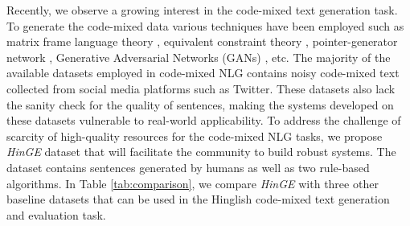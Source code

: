 \documentclass[11pt]{article}
\begin{document}
Recently, we observe a growing interest in the code-mixed text generation task. To generate the code-mixed data various techniques have been employed such as matrix frame language theory \cite{Lee2019, gupta-etal-2020-semi, dhruval_GCM_dependency_2021}, equivalent constraint theory \cite{pratapa-etal-2018-language}, pointer-generator network \cite{2018arXiv181010254I, winata-etal-2019-code, gupta-etal-2020-semi}, Generative Adversarial Networks (GANs) \cite{Gao_Bert_GAN_2019}, etc. The majority of the available datasets \cite{rijhwani-etal-2017-estimating, solorio-etal-2014-overview, patro-etal-2017-english} employed in code-mixed NLG contains noisy code-mixed text collected from social media platforms such as Twitter. These datasets also lack the sanity check for the quality of sentences, making the systems developed on these datasets vulnerable to real-world applicability.
To address the challenge of scarcity of high-quality resources for the code-mixed NLG tasks, we propose \textit{HinGE} dataset that will facilitate the community to build robust systems. The dataset contains sentences generated by humans as well as two rule-based algorithms. In Table \ref{tab:comparison}, we compare \textit{HinGE} with three other baseline datasets that can be used in the Hinglish code-mixed text generation and evaluation task.
\end{document}
